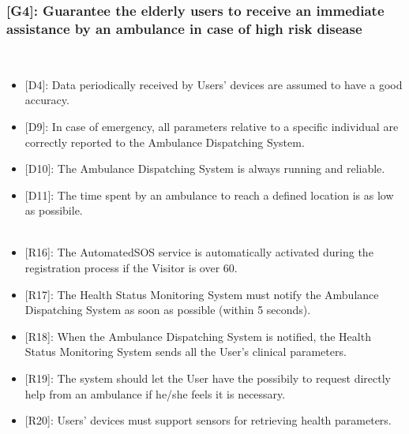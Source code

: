 \documentclass[12pt,a4paper]{article}
\begin{document}
	\subsubsection*{{[}{G4}{]}: Guarantee the elderly users to receive an immediate assistance by an ambulance in case of high risk disease}
	\begin{itemize}\\
		\begin{itemize}
			\item {[D4]}: Data periodically received by Users' devices are assumed to have a good accuracy.
			\item {[D9]}: In case of emergency, all parameters relative to a specific individual are correctly reported to the Ambulance Dispatching System.
			\item {[D10]}: The Ambulance Dispatching System is always running and reliable. 
			\item {[D11]}: The time spent by an ambulance to reach a defined location is as low as possibile. 
			\\ \\
			\item {[R16]}: The AutomatedSOS service is automatically activated during the registration process if the Visitor is over 60.
			\item {[R17]}: The Health Status Monitoring System must notify the Ambulance Dispatching System as soon as possible (within 5 seconds).
			\item {[R18]}: When the Ambulance Dispatching System is notified, the Health Status Monitoring System sends all the User's clinical parameters.
			\item {[R19]}: The system should let the User have the possibily to request directly help from an ambulance if he/she feels it is necessary.
			\item {[R20]}: Users' devices must support sensors for retrieving health parameters.
		\end{itemize}
	\end{itemize}
\end{document}
